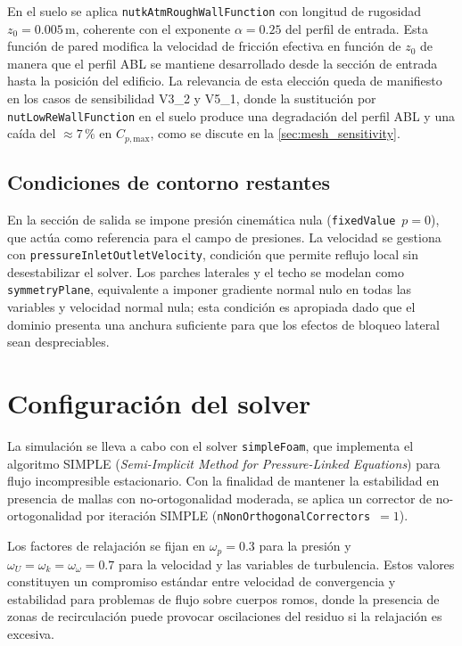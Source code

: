En el suelo se aplica \texttt{nutkAtmRoughWallFunction} con longitud de rugosidad $z_0 = 0.005$\,m, coherente con el exponente $\alpha = 0.25$ del perfil de entrada. Esta función de pared modifica la velocidad de fricción efectiva en función de $z_0$ de manera que el perfil ABL se mantiene desarrollado desde la sección de entrada hasta la posición del edificio. La relevancia de esta elección queda de manifiesto en los casos de sensibilidad V3\_2 y V5\_1, donde la sustitución por \texttt{nutLowReWallFunction} en el suelo produce una degradación del perfil ABL y una caída del ${\approx}7\,\%$ en $C_{p,\mathrm{max}}$, como se discute en la \autoref{sec:mesh_sensitivity}.

\subsection{Condiciones de contorno restantes}
\label{sec:bcs_rest}

En la sección de salida se impone presión cinemática nula (\texttt{fixedValue}~$p = 0$), que actúa como referencia para el campo de presiones. La velocidad se gestiona con \texttt{pressureInletOutletVelocity}, condición que permite reflujo local sin desestabilizar el solver. Los parches laterales y el techo se modelan como \texttt{symmetryPlane}, equivalente a imponer gradiente normal nulo en todas las variables y velocidad normal nula; esta condición es apropiada dado que el dominio presenta una anchura suficiente para que los efectos de bloqueo lateral sean despreciables.

\section{Configuración del solver}
\label{sec:solver}

La simulación se lleva a cabo con el solver \texttt{simpleFoam}, que implementa el algoritmo SIMPLE (\textit{Semi-Implicit Method for Pressure-Linked Equations}) para flujo incompresible estacionario. Con la finalidad de mantener la estabilidad en presencia de mallas con no-ortogonalidad moderada, se aplica un corrector de no-ortogonalidad por iteración SIMPLE (\texttt{nNonOrthogonalCorrectors}~$= 1$).

Los factores de relajación se fijan en $\omega_p = 0.3$ para la presión y $\omega_U = \omega_k = \omega_\omega = 0.7$ para la velocidad y las variables de turbulencia. Estos valores constituyen un compromiso estándar entre velocidad de convergencia y estabilidad para problemas de flujo sobre cuerpos romos, donde la presencia de zonas de recirculación puede provocar oscilaciones del residuo si la relajación es excesiva.

